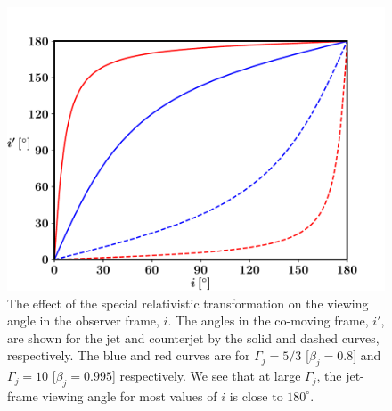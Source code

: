 \begin{figure}
\begin{center}
\includegraphics[scale=0.5]{angle_transformation.pdf}
\caption[The effect of the special relativistic transformation on the viewing angle]{The effect of the special relativistic transformation on the viewing angle in the observer frame, $i$. The angles in the co-moving frame, $i'$, are shown for the jet and counterjet by the solid and dashed curves, respectively. The blue and red curves are for $\Gamma_j = 5/3$ [$\beta_j = 0.8$] and $\Gamma_j = 10$ [$\beta_j = 0.995$] respectively. We see that at large $\Gamma_j$, the jet-frame viewing angle for most values of $i$ is close to $180^{\circ}$.}
\label{fig:The_angle_transformation}
\end{center}
\end{figure}

